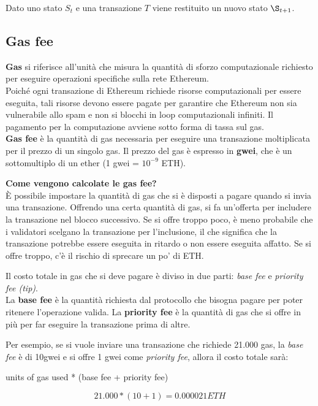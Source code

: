 Dato uno stato $S_t$ e una transazione $T$ viene restituito un nuovo stato
$\S_{t+1}$.

\subsection{Gas fee}
\textbf{Gas} si riferisce all'unità che misura la quantità di sforzo computazionale
richiesto per eseguire operazioni specifiche sulla rete Ethereum. \\
Poiché ogni transazione di Ethereum richiede risorse computazionali per essere
eseguita, tali risorse devono essere pagate per garantire che Ethereum non sia
vulnerabile allo spam e non si blocchi in loop computazionali infiniti. Il
pagamento per la computazione avviene sotto forma di tassa sul gas. \\
\textbf{Gas fee} è la quantità di gas necessaria per eseguire una transazione
moltiplicata per il prezzo di un singolo gas. Il prezzo del gas è espresso in
\textbf{gwei}, che è un sottomultiplo di un ether (1 gwei = $10^{-9}$ ETH).

\textbf{Come vengono calcolate le gas fee?} \\
È possibile impostare la quantità di gas che si è disposti a pagare quando si
invia una transazione. Offrendo una certa quantità di gas, si fa un'offerta per
includere la transazione nel blocco successivo. Se si offre troppo poco, è meno
probabile che i validatori scelgano la transazione per l'inclusione, il che
significa che la transazione potrebbe essere eseguita in ritardo o non essere
eseguita affatto. Se si offre troppo, c'è il rischio di sprecare un po' di ETH.

Il costo totale in gas che si deve pagare è diviso in due parti: 
\textit{base fee} e \textit{priority fee (tip)}. \\
La \textbf{base fee} è la quantità richiesta dal protocollo che bisogna pagare
per poter ritenere l'operazione valida. La \textbf{priority fee} è la quantità
di gas che si offre in più per far eseguire la transazione prima di altre. 

\newpage

Per esempio, se si vuole inviare una transazione che richiede 21.000 gas, la
\textit{base fee} è di 10gwei e si offre 1 gwei come \textit{priority fee},
allora il costo totale sarà: 
\begin{center}
units of gas used * (base fee + priority fee)
\end{center}
\begin{equation}
    \label{eq:gasFee}
    21.000 * (10 + 1) = 0.000021 ETH
\end{equation}


